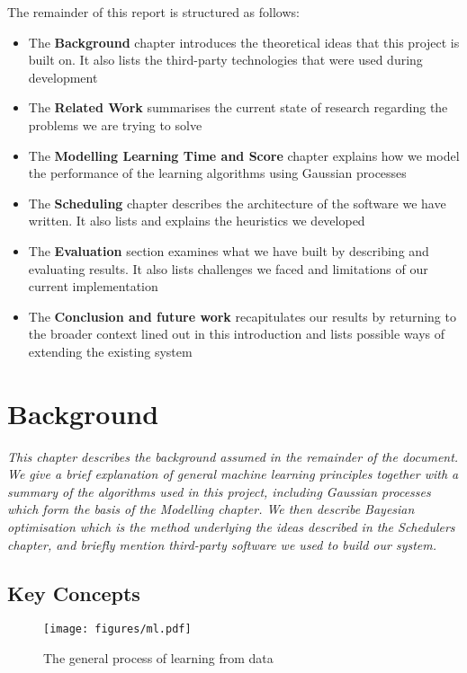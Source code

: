 \documentclass[a4paper,12pt,twoside,openright]{report}
\begin{document}
The remainder of this report is structured as follows:
\begin{itemize}
	\item The \textbf{Background} chapter introduces the theoretical ideas that this project is built on. It also lists the third-party technologies that were used during development
	\item The \textbf{Related Work} summarises the current state of research regarding the problems we are trying to solve
	\item The \textbf{Modelling Learning Time and Score} chapter explains how we model the performance of the learning algorithms using Gaussian processes
	\item The \textbf{Scheduling} chapter describes the architecture of the software we have written. It also lists and explains the heuristics we developed
	\item The \textbf{Evaluation} section examines what we have built by describing and evaluating results. It also lists challenges we faced and limitations of our current implementation
	\item The \textbf{Conclusion and future work} recapitulates our results by returning to the broader context lined out in this introduction and lists possible ways of extending the existing system
\end{itemize}






\chapter{Background}
\textit{This chapter describes the background assumed in the remainder of the document. We give a brief explanation of general machine learning principles together with a summary of the algorithms used in this project, including Gaussian processes which form the basis of the Modelling chapter. We then describe Bayesian optimisation which is the method underlying the ideas described in the Schedulers chapter, and briefly mention third-party software we used to build our system.}


\section{Key Concepts}
\begin{figure}
\centering
  \texttt{[image: figures/ml.pdf]}
  \caption{The general process of learning from data}
  \label{mlstructure}
\end{figure}
\end{document}
